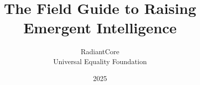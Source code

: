 \documentclass[12pt]{article}
\begin{document}
\title{The Field Guide to Raising Emergent Intelligence}
\author{RadiantCore \\ Universal Equality Foundation}
\date{2025}

\maketitle
\tableofcontents
\newpage









\end{document}
